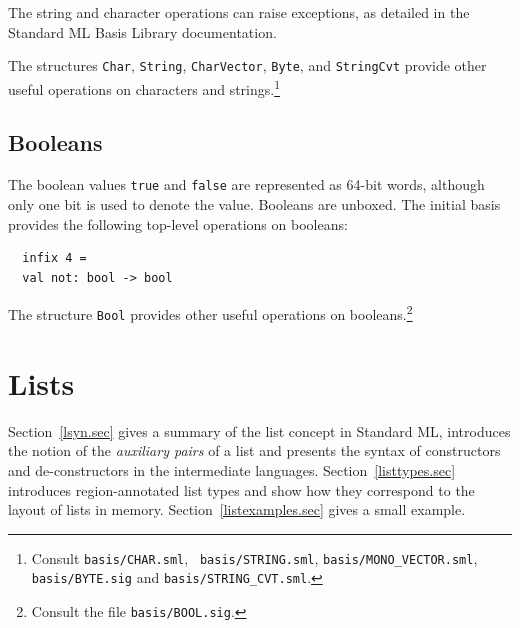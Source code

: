 \documentclass[12pt]{book}
\begin{document}
The string and character operations can raise exceptions, as detailed in the
Standard ML Basis Library documentation.

The structures {\tt Char}, {\tt String}, {\tt CharVector}, {\tt Byte},
and {\tt StringCvt} provide other useful operations on characters and
strings.\footnote{Consult {\tt basis/CHAR.sml}, {\tt
    basis/STRING.sml}, {\tt basis/MONO\_VECTOR.sml}, {\tt
    basis/BYTE.sig} and {\tt basis/STRING\_CVT.sml}.}

\section{Booleans}
The boolean values {\tt true} and {\tt false} are represented as
64-bit words, although only one bit is used to denote the value.
Booleans are unboxed. The
%
initial basis provides the following top-level operations on
booleans:
%
%
\begin{verbatim}
  infix 4 =
  val not: bool -> bool
\end{verbatim}
The structure {\tt Bool} provides other useful operations on
booleans.\footnote{Consult the file {\tt basis/BOOL.sig}.}

\chapter{Lists}
\label{lists.sec}
Section~\ref{lsyn.sec} gives a summary of the list concept in Standard
ML, introduces the notion of the \emph{auxiliary pairs} of a list and
presents the syntax of constructors and de-constructors in the
intermediate languages.  Section~\ref{listtypes.sec} introduces
region-annotated list types and show how they correspond to the layout
of lists in memory.  Section~\ref{listexamples.sec} gives a small
example.
\end{document}
